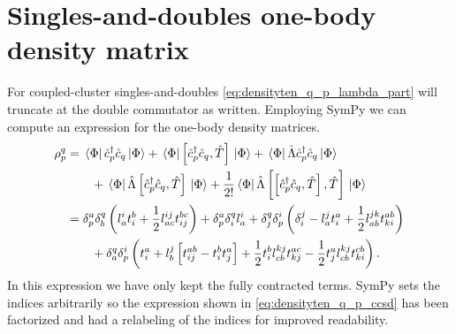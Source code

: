     \section{Singles-and-doubles one-body density matrix}
        For coupled-cluster singles-and-doubles \autoref{eq:densityten_q_p_lambda_part}
        will truncate at the double commutator as written. Employing
        SymPy\cite{sympy} we can compute an expression for the one-body density
        matrices.
        \begin{align}
            \rho^{q}_{p}
            &= \bra*{\Phi}\hat{c}_{p}^{\dagger}\hat{c}_{q}\ket*{\Phi}
            + \bra*{\Phi}\left[\hat{c}_{p}^{\dagger}\hat{c}_{q}, \hat{T}\right]\ket*{\Phi}
            + \bra*{\Phi}\hat{\Lambda} \hat{c}_{p}^{\dagger}\hat{c}_{q}\ket*{\Phi}
            \nonumber \\
            &\qquad
            + \bra*{\Phi}\hat{\Lambda} \left[\hat{c}_{p}^{\dagger}\hat{c}_{q}, \hat{T}\right]\ket*{\Phi}
            + \frac{1}{2!}
            \bra*{\Phi}\hat{\Lambda} \left[\left[\hat{c}_{p}^{\dagger}\hat{c}_{q}, \hat{T}\right], \hat{T}\right]\ket*{\Phi}
            \\
            &=
            \delta^a_p \delta^q_b \left( 
                l^i_a t^b_i + \frac{1}{2} l^{ij}_{ac} t^{bc}_{ij}
             \right)
            + \delta^a_p \delta^q_i l^i_a
            + \delta^q_j \delta^i_p \left( 
                \delta^j_i
                - l^j_a t^a_i
                + \frac{1}{2} l^{jk}_{ab} t^{ab}_{ki}
             \right)
            \nonumber \\
            &\qquad
            + \delta^q_a \delta^i_p \left( 
                t^a_i
                + l^j_b \left[ 
                    t^{ab}_{ij} - t^b_i t^a_j
                 \right]
                + \frac{1}{2} t^{b}_{i} l^{kj}_{cb} t^{ac}_{kj}
                - \frac{1}{2} t^{a}_{j} l^{kj}_{cb} t^{cb}_{ki}
             \right).
            \label{eq:densityten_q_p_ccsd}
        \end{align}
        In this expression we have only kept the fully contracted terms. SymPy
        sets the indices arbitrarily so the expression shown in
        \autoref{eq:densityten_q_p_ccsd} has been factorized and had a relabeling of
        the indices for improved readability.

\clearemptydoublepage
